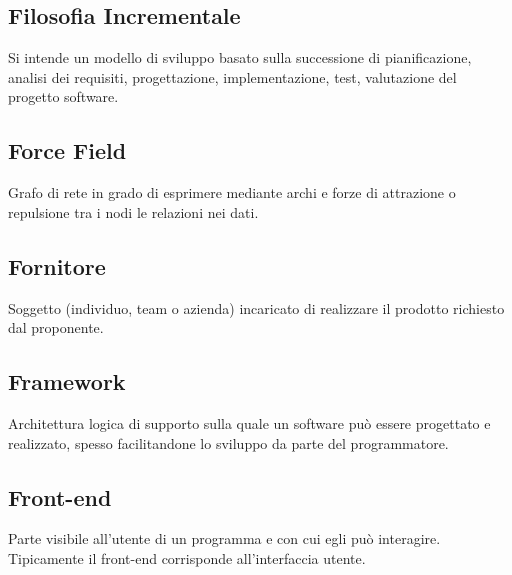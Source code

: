 \documentclass[../glossario.tex]{subfiles}
\begin{document}
\subsection*{Filosofia Incrementale}
Si intende un modello di sviluppo basato sulla successione di pianificazione, analisi dei requisiti, progettazione, implementazione, test, valutazione del progetto software.

\subsection*{Force Field}
Grafo di rete in grado di esprimere mediante archi e forze di attrazione o repulsione tra i nodi le relazioni nei dati.

\subsection*{Fornitore}
Soggetto (individuo, team o azienda) incaricato di realizzare il prodotto richiesto dal proponente.

\subsection*{Framework}
Architettura logica di supporto sulla quale un software può essere progettato e realizzato, spesso facilitandone lo sviluppo da parte del programmatore.

\subsection*{Front-end}
Parte visibile all'utente di un programma e con cui egli può interagire. Tipicamente il front-end corrisponde all'interfaccia utente.

    
\end{document}
